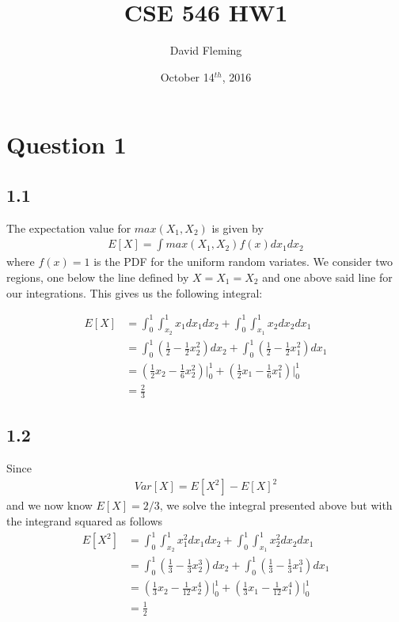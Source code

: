 \documentclass[12pt]{amsart}
\title{CSE 546 HW1}
\author{David Fleming}
\date{October 14$^{th}$, 2016}
\begin{document}
\maketitle
\tableofcontents


\section*{Question 1}

\subsection*{1.1}
The expectation value for $max(X_1, X_2)$ is given by
\begin{align}
E[X] = \int max(X_1,X_2) f(x) dx_1 dx_2
\end{align}
where $f(x) = 1$ is the PDF for the uniform random variates.  We consider two regions, one below the line defined by $X = X_1 = X_2$ and one above said line for our integrations.  This gives us the following integral:

\begin{equation} \label{eqn:1.1}
\begin{split}
E[X] & = \int_0^1 \int_{x_2}^1 x_1 dx_1 dx_2 + \int_0^1 \int_{x_1}^1 x_2 dx_2 dx_1 \\
& = \int_0^1 (\frac{1}{2} - \frac{1}{2}x_2^2) dx_2 + \int_0^1 (\frac{1}{2} - \frac{1}{2}x_1^2) dx_1 \\
& = (\frac{1}{2}x_2 - \frac{1}{6}x_2^2) \vert_0^1 + (\frac{1}{2}x_1 - \frac{1}{6}x_1^2) \vert_0^1 \\
& = \frac{2}{3}
\end{split}
\end{equation}

\subsection*{1.2}
Since
\begin{align}
Var[X] = E[X^2] - E[X]^2
\end{align}
and we now know $E[X] = 2/3$, we solve the integral presented above but with the integrand squared as follows
\begin{equation} \label{eqn:1.2}
\begin{split}
E[X^2] & = \int_0^1 \int_{x_2}^1 x_1^2 dx_1 dx_2 + \int_0^1 \int_{x_1}^1 x_2^2 dx_2 dx_1 \\
& = \int_0^1 (\frac{1}{3} - \frac{1}{3}x_2^3) dx_2 + \int_0^1 (\frac{1}{3} - \frac{1}{3}x_1^3) dx_1 \\
& = (\frac{1}{3}x_2 - \frac{1}{12}x_2^4)\vert_0^1 + (\frac{1}{3}x_1 - \frac{1}{12}x_1^4)\vert_0^1 \\
& = \frac{1}{2}
\end{split}
\end{equation}
\end{document}
